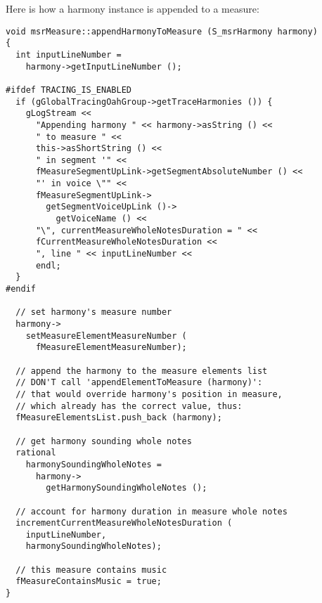 Here is how a harmony instance is appended to a measure:
\begin{lstlisting}[language=CPlusPlus]
void msrMeasure::appendHarmonyToMeasure (S_msrHarmony harmony)
{
  int inputLineNumber =
    harmony->getInputLineNumber ();

#ifdef TRACING_IS_ENABLED
  if (gGlobalTracingOahGroup->getTraceHarmonies ()) {
    gLogStream <<
      "Appending harmony " << harmony->asString () <<
      " to measure " <<
      this->asShortString () <<
      " in segment '" <<
      fMeasureSegmentUpLink->getSegmentAbsoluteNumber () <<
      "' in voice \"" <<
      fMeasureSegmentUpLink->
        getSegmentVoiceUpLink ()->
          getVoiceName () <<
      "\", currentMeasureWholeNotesDuration = " <<
      fCurrentMeasureWholeNotesDuration <<
      ", line " << inputLineNumber <<
      endl;
  }
#endif

  // set harmony's measure number
  harmony->
    setMeasureElementMeasureNumber (
      fMeasureElementMeasureNumber);

  // append the harmony to the measure elements list
  // DON'T call 'appendElementToMeasure (harmony)':
  // that would override harmony's position in measure,
  // which already has the correct value, thus:
  fMeasureElementsList.push_back (harmony);

  // get harmony sounding whole notes
  rational
    harmonySoundingWholeNotes =
      harmony->
        getHarmonySoundingWholeNotes ();

  // account for harmony duration in measure whole notes
  incrementCurrentMeasureWholeNotesDuration (
    inputLineNumber,
    harmonySoundingWholeNotes);

  // this measure contains music
  fMeasureContainsMusic = true;
}
\end{lstlisting}

